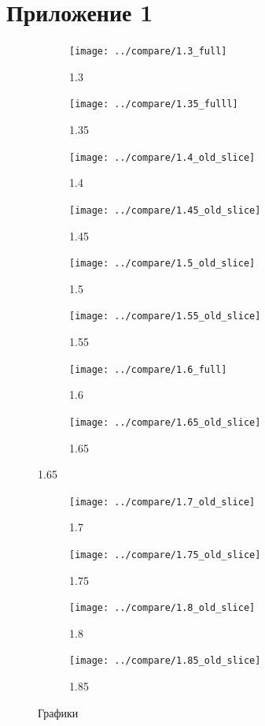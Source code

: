 \documentclass[12pt,a4paper]{article}
\begin{document}
	\section{Приложение 1}
	\begin{figure}[H]
		\begin{subfigure}{.5\textwidth}
		\texttt{[image: ../compare/1.3\_full]}
		\caption{1.3}
		\label{fig:21}
		\end{subfigure}
		\begin{subfigure}{.5\textwidth}
		\texttt{[image: ../compare/1.35\_fulll]}
		\caption{1.35}
		\label{fig:22}
		\end{subfigure}%
	
		\begin{subfigure}{.5\textwidth}
		\texttt{[image: ../compare/1.4\_old\_slice]}
		\caption{1.4}
		\label{fig:23}
		\end{subfigure}
		\begin{subfigure}{.5\textwidth}
		\texttt{[image: ../compare/1.45\_old\_slice]}
		\caption{1.45}
		\label{fig:24}
		\end{subfigure}%
	
		\begin{subfigure}{.5\textwidth}
		\texttt{[image: ../compare/1.5\_old\_slice]}
		\caption{1.5}
		\label{fig:25}
		\end{subfigure}
		\begin{subfigure}{.5\textwidth}
		\texttt{[image: ../compare/1.55\_old\_slice]}
		\caption{1.55}
		\label{fig:26}
		\end{subfigure}%
	
		\begin{subfigure}{.5\textwidth}
		\texttt{[image: ../compare/1.6\_full]}
		\caption{1.6}
		\label{fig:27}
		\end{subfigure}
		\begin{subfigure}{.5\textwidth}
		\texttt{[image: ../compare/1.65\_old\_slice]}
		\caption{1.65}
		\label{fig:28}
		\end{subfigure}%
	\end{figure}
	\begin{figure}
		\ContinuedFloat
		\begin{subfigure}{.5\textwidth}
		\texttt{[image: ../compare/1.7\_old\_slice]}
		\caption{1.7}
		\label{fig:29}
		\end{subfigure}
		\begin{subfigure}{.5\textwidth}
		\texttt{[image: ../compare/1.75\_old\_slice]}
		\caption{1.75}
		\label{fig:30}
		\end{subfigure}%
	
	
		\begin{subfigure}{.5\textwidth}
		\texttt{[image: ../compare/1.8\_old\_slice]}
		\caption{1.8}
		\label{fig:31}
		\end{subfigure}
		\begin{subfigure}{.5\textwidth}
		\texttt{[image: ../compare/1.85\_old\_slice]}
		\caption{1.85}
		\label{fig:32}
		\end{subfigure}%
	
	\label{fig:2}
	\caption{Графики}
	\end{figure}	
\end{document}
